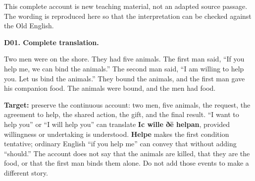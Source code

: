 This complete account is new teaching material, not an adapted source passage. The wording is reproduced here so that the interpretation can be checked against the Old English.

\par\begin{minipage}{\linewidth}\raggedright
{}
\end{minipage}\par

\par\begin{minipage}{\linewidth}\raggedright
\textbf{D01. Complete translation.}

Two men were on the shore. They had five animals. The first man said, “If you help me, we can bind the animals.” The second man said, “I am willing to help you. Let us bind the animals.” They bound the animals, and the first man gave his companion food. The animals were bound, and the men had food.

\textbf{Target:} preserve the continuous account: two men, five animals, the request, the agreement to help, the shared action, the gift, and the final result. “I want to help you” or “I will help you” can translate \textbf{Ic wille ðē helpan}, provided willingness or undertaking is understood. \textbf{Helpe} makes the first condition tentative; ordinary English “if you help me” can convey that without adding “should.” The account does not say that the animals are killed, that they are the food, or that the first man binds them alone. Do not add those events to make a different story.

\end{minipage}\par\addvspace{4pt}


